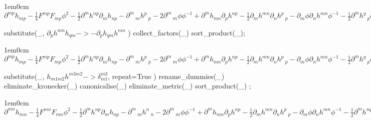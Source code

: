 \documentclass[12pt,a4paper,svgnames]{extarticle}
\begin{document}
\begin{adjustwidth}{1em}{0cm}${}\partial^{m p}{h_{m p}} - \frac{1}{4}F^{m p} F_{m p} {\phi}^{2} - \frac{1}{2}\partial^{m}{h^{n p}} \partial_{m}{h_{n p}}-\partial^{m}\,_{m}{h^{p}\,_{p}}-2\partial^{m}\,_{m}{\phi} {\phi}^{-1}+\partial^{m}{h_{m n}} \partial_{p}{h^{n p}} - \frac{1}{2}\partial_{m}{h^{m n}} \partial_{n}{h^{p}\,_{p}}-\partial_{m}{\phi} \partial_{n}{h^{m n}} {\phi}^{-1} - \frac{1}{2}\partial^{m}{h^{q}\,_{p}} \partial_{q}{h_{m r}} h^{p r}+\frac{1}{4}\partial^{m}{h^{q}\,_{p}} \partial_{m}{h_{q r}} h^{p r}+\frac{1}{2}\partial^{m}{h_{m}\,^{p}} \partial_{p}{h_{q r}} h^{q r}+\partial^{m}{\phi} \partial^{p}{h_{m p}} {\phi}^{-1} - \frac{1}{4}\partial^{m}{h^{p}\,_{p}} \partial_{m}{h_{q r}} h^{q r}-\partial^{m}{\phi} \partial_{m}{h^{p}\,_{p}} {\phi}^{-1}$\end{adjustwidth}
\begin{python}
substitute(_, $\partial_{p}{h^{n m}} h_{q m} -> - \partial_{p}{h_{q m}} h^{n m}$ )
collect_factors(_)
sort_product(_);
\end{python}
\begin{adjustwidth}{1em}{0cm}${}\partial^{m p}{h_{m p}} - \frac{1}{4}F^{m p} F_{m p} {\phi}^{2} - \frac{1}{2}\partial^{m}{h^{n p}} \partial_{m}{h_{n p}}-\partial^{m}\,_{m}{h^{p}\,_{p}}-2\partial^{m}\,_{m}{\phi} {\phi}^{-1}+\partial^{m}{h_{m n}} \partial_{p}{h^{n p}} - \frac{1}{2}\partial_{m}{h^{m n}} \partial_{n}{h^{p}\,_{p}}-\partial_{m}{\phi} \partial_{n}{h^{m n}} {\phi}^{-1} - \frac{1}{2}\partial^{m}{h^{q}\,_{p}} \partial_{q}{h_{m r}} h^{p r}+\frac{1}{4}\partial^{m}{h^{q}\,_{p}} \partial_{m}{h_{q r}} h^{p r}+\frac{1}{2}\partial^{m}{h_{m}\,^{p}} \partial_{p}{h_{q r}} h^{q r}+\partial^{m}{\phi} \partial^{p}{h_{m p}} {\phi}^{-1} - \frac{1}{4}\partial^{m}{h^{p}\,_{p}} \partial_{m}{h_{q r}} h^{q r}-\partial^{m}{\phi} \partial_{m}{h^{p}\,_{p}} {\phi}^{-1}$\end{adjustwidth}
\begin{python}
substitute(_, $h_{m1 m2} h^{m3 m2} -> \delta_{m1}^{m3}$, repeat=True )
rename_dummies(_)
eliminate_kronecker(_)
canonicalise(_)
eliminate_metric(_)
sort_product(_)
;
\end{python}
\begin{adjustwidth}{1em}{0cm}${}\partial^{m n}{h_{m n}} - \frac{1}{4}F^{m n} F_{m n} {\phi}^{2} - \frac{1}{2}\partial^{m}{h^{n p}} \partial_{m}{h_{n p}}-\partial^{m}\,_{m}{h^{n}\,_{n}}-2\partial^{m}\,_{m}{\phi} {\phi}^{-1}+\partial^{m}{h_{m n}} \partial_{p}{h^{n p}} - \frac{1}{2}\partial_{m}{h^{m n}} \partial_{n}{h^{p}\,_{p}}-\partial_{m}{\phi} \partial_{n}{h^{m n}} {\phi}^{-1} - \frac{1}{2}\partial^{m}{h^{n q}} \partial_{n}{h_{m q}}+\frac{1}{4}\partial^{m}{h^{n q}} \partial_{m}{h_{n q}}+\frac{1}{2}\partial^{m}{h_{m}\,^{n}} \partial_{n}{h^{q}\,_{q}}+\partial^{m}{\phi} \partial^{n}{h_{m n}} {\phi}^{-1} - \frac{1}{4}\partial^{m}{h^{n}\,_{n}} \partial_{m}{h^{q}\,_{q}}-\partial^{m}{\phi} \partial_{m}{h^{n}\,_{n}} {\phi}^{-1}$\end{adjustwidth}
\end{document}
